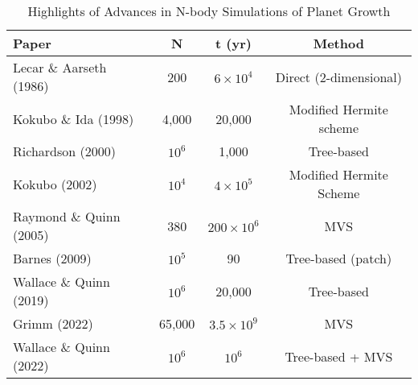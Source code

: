 \begin{table*}
\begin{center}
\caption{Highlights of Advances in N-body Simulations of Planet Growth}
\begin{tabularx}{1.0\textwidth}{l@{\extracolsep{\fill}}ccc} \hline \hline
Paper & N & t (yr) & Method \\ \hline
Lecar \& Aarseth (1986) & 200 & $6 \times 10^{4}$ & Direct (2-dimensional) \\
Kokubo \& Ida (1998) & 4,000 & 20,000 & Modified Hermite scheme \\
Richardson (2000) & $10^{6}$ & 1,000 & Tree-based \\
Kokubo (2002) & $10^{4}$ & $4 \times 10^{5}$ & Modified Hermite Scheme \\
Raymond \& Quinn (2005) & 380 & $200 \times 10^{6}$ & MVS \\
Barnes (2009) & $10^{5}$ & 90 & Tree-based (patch) \\
Wallace \& Quinn (2019) & $10^{6}$ &  20,000 & Tree-based \\
Grimm (2022) & 65,000 & $3.5 \times 10^{9}$ & MVS \\
Wallace \& Quinn (2022) & $10^{6}$ &  $10^{6}$ & Tree-based + MVS \\ \hline
\end{tabularx}\\
\begin{flushleft}
\end{flushleft}
\label{tab:nbody_improve}
\end{center}
\end{table*}